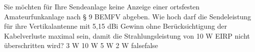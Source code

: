     {Sie möchten für Ihre Sendeanlage keine Anzeige einer ortsfesten Amateurfunkanlage nach § 9 BEMFV abgeben. Wie hoch darf die Sendeleistung für ihre Vertikalantenne mit 5,15 dBi Gewinn ohne Berücksichtigung der Kabelverluste maximal sein, damit die Strahlungsleistung von 10 W EIRP nicht überschritten wird?}
    {3 W}
    {10 W}
    {5 W}
    {2 W}
    {false}{false}